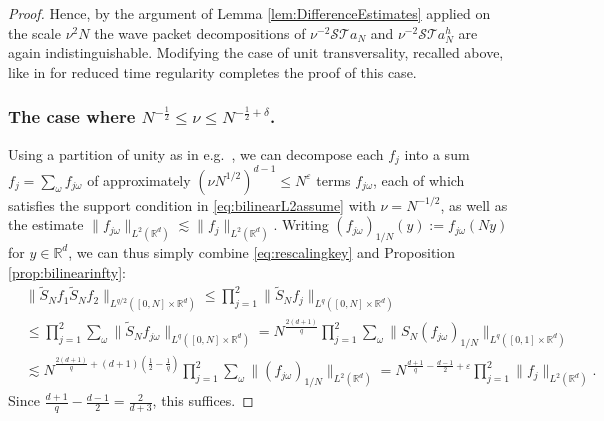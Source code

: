 \documentclass{amsart}
\numberwithin{equation}{section}
\theoremstyle{definition}
\newcommand{\R}{\mathbb{R}}
\newcommand{\Rd}{\mathbb{R}^{d}}
\newcommand {\veps}{\varepsilon}
\newcommand {\w}{\omega}
\begin{document}
\begin{proof}
Hence, by the argument of Lemma \ref{lem:DifferenceEstimates} applied on the scale $\nu^2 N$ the wave packet decompositions of $\nu^{-2} \mathcal{S} \mathcal{T} a_N$ and $\nu^{-2} \mathcal{S} \mathcal{T} a_N^h$ are again indistinguishable. Modifying the case of unit transversality, recalled above, like in \cite{SchippaTataru2025} for reduced time regularity completes the proof of this case.

\subsubsection*{The case where $N^{-\frac{1}{2}}\leq \nu\leq N^{-\frac{1}{2}+\delta}$.}


Using a partition of unity as in e.g.~\cite[p.~11]{Rozendaal22b}, 
we can decompose each $f_{j}$ into a sum $f_{j}=\sum_{\w} f_{j\w}$ of approximately $(\nu N^{1/2})^{d-1}\leq N^{\veps}$ terms $f_{j\w}$, each of which satisfies the support condition in \eqref{eq:bilinearL2assume} with $\nu=N^{-1/2}$,  as well as the estimate $\|f_{j\w}\|_{L^{2}(\Rd)}\lesssim \|f_{j}\|_{L^{2}(\Rd)}$. Writing $(f_{j\w})_{1/N}(y):=f_{j\w}(Ny)$ for $y\in\Rd$, we can thus simply combine \eqref{eq:rescalingkey} and Proposition \ref{prop:bilinearinfty}:
\begin{align*}
&\| \tilde{S}_N  f_1 \tilde{S}_N f_2 \|_{L^{q/2}([0,N] \times \R^d)}\leq \prod_{j=1}^{2}\| \tilde{S}_N  f_j\|_{L^{q}([0,N]\times\Rd)}\\
&\leq \prod_{j=1}^{2}\sum_{\w}\| \tilde{S}_N  f_{j\w}\|_{L^{q}([0,N]\times\Rd)}=N^{\frac{2(d+1)}{q}}\prod_{j=1}^{2}\sum_{\w}\|S_N (f_{j\w})_{1/N}\|_{L^{q}([0,1]\times\Rd)}\\
&\lesssim N^{\frac{2(d+1)}{q}+(d+1)(\frac{1}{2}-\frac{1}{q})}\prod_{j=1}^{2}\sum_{\w}\| (f_{j\w})_{1/N}\|_{L^{2}(\Rd)}=N^{\frac{d+1}{q}-\frac{d-1}{2}+\veps}\prod_{j=1}^{2}\| f_{j}\|_{L^{2}(\Rd)}.
\end{align*}
Since $\frac{d+1}{q}-\frac{d-1}{2}=\frac{2}{d+3}$, this suffices.

\end{proof}
\end{document}
